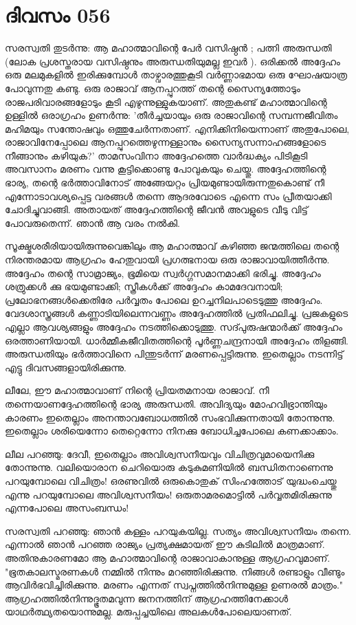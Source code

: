 \newpage
\section{ദിവസം 056}


സരസ്വതി തുടര്‍ന്നു: ആ മഹാത്മാവിന്റെ പേര്‍ വസിഷ്ഠന്‍ ; പത്നി അരുന്ധതി (ലോക പ്രശസ്തരായ വസിഷ്ഠനും അരുന്ധതിയുമല്ല ഇവര്‍ ). ഒരിക്കല്‍ അദ്ദേഹം ഒരു മലമുകളില്‍ ഇരിക്കുമ്പോള്‍ താഴ്വാരത്തുകൂടി വര്‍ണ്ണാഭമായ ഒരു ഘോഷയാത്ര പോവുന്നതു കണ്ടു. ഒരു രാജാവ്‌ ആനപ്പുറത്ത്‌ തന്റെ സൈന്യത്തോടും രാജപരിവാരങ്ങളോടും കൂടി എഴുന്നുള്ളുകയാണ്‌. അതുകണ്ട്‌ മഹാത്മാവിന്റെ ഉള്ളില്‍ ഒരാഗ്രഹം ഉണര്‍ന്നു: 'തീര്‍ച്ചയായും ഒരു രാജാവിന്റെ സമ്പന്നജീവിതം മഹിമയും സന്തോഷവും ഒത്തുചേര്‍ന്നതാണ്‌. എനിക്കിനിയെന്നാണ്‌ അതുപോലെ, രാജാവിനേപ്പോലെ ആനപ്പുറത്തെഴുന്നള്ളാനും സൈന്യസന്നാഹങ്ങളോടെ നീങ്ങാനും കഴിയുക?' താമസംവിനാ അദ്ദേഹത്തെ വാര്‍ദ്ധക്യം പിടികൂടി അവസാനം മരണം വന്നു കൂട്ടിക്കൊണ്ടു പോവുകയും ചെയ്തു. അദ്ദേഹത്തിന്റെ ഭാര്യ, തന്റെ ഭര്‍ത്താവിനോട്‌ അങ്ങേയറ്റം പ്രിയമുണ്ടായിരുന്നതുകൊണ്ട്‌ നീ എന്നോടാവശ്യപ്പെട്ട വരങ്ങള്‍ തന്നെ ആദരവോടെ എന്നെ സം പ്രീതയാക്കി ചോദിച്ചുവാങ്ങി. അതായത്‌ അദ്ദേഹത്തിന്റെ ജീവന്‍ അവളുടെ വീടു വിട്ട്‌ പോവരുതെന്ന്. ഞാന്‍ ആ വരം നല്‍കി. 

സൂക്ഷ്മശരീരിയായിരുന്നുവെങ്കിലും ആ മഹാത്മാവ്‌ കഴിഞ്ഞ ജന്മത്തിലെ തന്റെ നിരന്തരമായ ആഗ്രഹം ഹേതുവായി പ്രഗത്ഭനായ ഒരു രാജാവായിത്തീര്‍ന്നു. അദ്ദേഹം തന്റെ സാമ്രാജ്യം, ഭൂമിയെ സ്വര്‍ഗ്ഗസമാനമാക്കി ഭരിച്ചു. അദ്ദേഹം ശത്രുക്കള്‍ ക്കു ഭയമുണ്ടാക്കി; സ്ത്രീകള്‍ക്ക്‌ അദ്ദേഹം കാമദേവനായി; പ്രലോഭനങ്ങള്‍ക്കെതിരേ പര്‍വ്വതം പോലെ ഉറച്ചനിലപാടെടുത്തു അദ്ദേഹം. വേദശാസ്ത്രങ്ങള്‍ കണ്ണാടിയിലെന്നവണ്ണം അദ്ദേഹത്തില്‍ പ്രതിഫലിച്ചു. പ്രജകളുടെ എല്ലാ ആവശ്യങ്ങളും അദ്ദേഹം നടത്തിക്കൊടുത്തു. സദ്പുരുഷന്മാര്‍ക്ക്‌ അദ്ദേഹം ഒരത്താണിയായി. ധാര്‍മ്മീകജീവിതത്തിന്റെ പൂര്‍ണ്ണചന്ദ്രനായി അദ്ദേഹം തിളങ്ങി. അരുന്ധതിയും ഭര്‍ത്താവിനെ പിന്തുടര്‍ന്ന് മരണപ്പെട്ടിരുന്നു. ഇതെല്ലാം നടന്നിട്ട്‌ എട്ടു ദിവസങ്ങളായിരിക്കുന്നു.

ലീലേ, ഈ മഹാത്മാവാണ്‌ നിന്റെ പ്രിയതമനായ രാജാവ്‌. നീ തന്നെയാണദ്ദേഹത്തിന്റെ ഭാര്യ അരുന്ധതി. അവിദ്യയും മോഹവിഭ്രാന്തിയും കാരണം ഇതെല്ലാം അനന്താവബോധത്തില്‍ സംഭവിക്കുന്നതായി തോന്നുന്നു. ഇതെല്ലാം ശരിയെന്നോ തെറ്റെന്നോ നിനക്കു ബോധിച്ചപോലെ കണക്കാക്കാം. 

ലീല പറഞ്ഞു: ദേവീ, ഇതെല്ലാം അവിശ്വസനീയവും വിചിത്രവുമായെനിക്കു തോന്നുന്നു. വലിയൊരാന ചെറിയൊരു കടുകുമണിയില്‍ ബന്ധിതനാണെന്നു പറയുമ്പോലെ വിചിത്രം! ഒരണുവില്‍ ഒരുകൊതുക്‌ സിംഹത്തോട്‌ യുദ്ധംചെയ്തു എന്നു പറയുമ്പോലെ അവിശ്വസനീയം! ഒരുതാമരമൊട്ടില്‍ പര്‍വ്വതമിരിക്കുന്നു എന്നപോലെ അസംബന്ധം!

സരസ്വതി പറഞ്ഞു: ഞാന്‍ കള്ളം പറയുകയില്ല. സത്യം അവിശ്വസനീയം തന്നെ. എന്നാല്‍ ഞാന്‍ പറഞ്ഞ രാജ്യം പ്രത്യക്ഷമായത്‌ ഈ കുടിലില്‍ മാത്രമാണ്‌. അതിനുകാരണമോ ആ മഹാത്മാവിന്റെ രാജാവാകാനുള്ള ആഗ്രഹവുമാണ്‌. "ഭൂതകാലസ്മരണകള്‍ നമ്മില്‍ നിന്നും മറഞ്ഞിരിക്കുന്നു. നിങ്ങള്‍ രണ്ടാളും വീണ്ടും ആവിര്‍ഭവിച്ചിരിക്കുന്നു. മരണം എന്നത്‌ സ്വപ്നത്തില്‍നിന്നുമുള്ള ഉണരല്‍ മാത്രം." ആഗ്രഹത്തില്‍നിന്നുദ്ഭൂതമവുന്ന ജനനത്തിന്‌ ആഗ്രഹത്തിനേക്കാള്‍ യാഥര്‍ത്ഥ്യതയൊന്നുമല്ല. മരുപ്പച്ചയിലെ അലകള്‍പോലെയാണത്‌.
